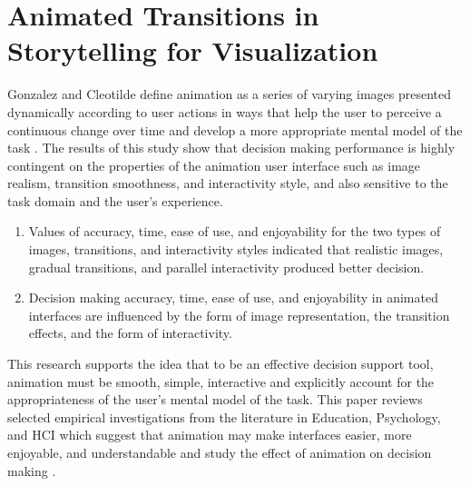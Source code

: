 \documentclass{egpubl}
\begin{document}
\section{Animated Transitions in Storytelling for Visualization}
Gonzalez and Cleotilde define animation as a series of varying images presented dynamically according to user actions in ways that help the user to perceive a continuous change over time and develop a more appropriate mental model of the task \cite{gonzalez1995animation}.
The results of this study show that decision making performance is highly contingent on the properties of the animation user interface such as image realism, transition smoothness, and interactivity style, and also sensitive to the task domain and the user's experience.  
\begin{enumerate}
\item Values of accuracy, time, ease of use, and enjoyability for the two types of images, transitions, and interactivity styles indicated that realistic images, gradual transitions, and parallel interactivity produced better decision.
\item Decision making accuracy, time, ease of use, and enjoyability in animated interfaces are influenced by the form of image representation, the transition effects, and the form of interactivity.
\end{enumerate}
This research supports the idea that to be an effective decision support tool, animation must be smooth, simple, interactive and explicitly account for the appropriateness of the user's mental model of the task.
This paper reviews selected empirical investigations from the literature in Education, Psychology, and HCI which suggest that animation may make interfaces easier, more enjoyable, and understandable and study the effect of animation on decision making \cite{gonzalez1996does}.
\end{document}
